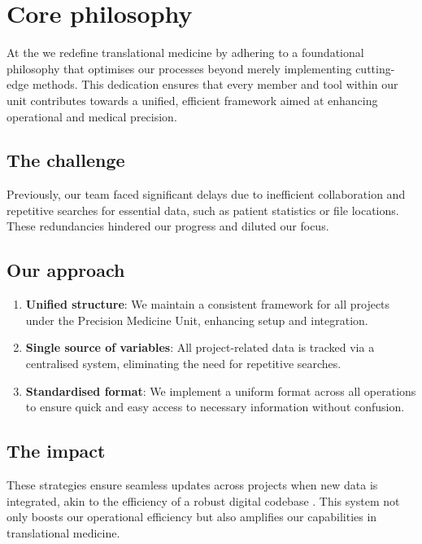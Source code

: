 \section{Core philosophy}

At the \pmu we redefine translational medicine by adhering to a foundational philosophy that optimises our processes beyond merely implementing cutting-edge methods. This dedication ensures that every member and tool within our unit contributes towards a unified, efficient framework aimed at enhancing operational and medical precision.

\subsection*{The challenge}

Previously, our team faced significant delays due to inefficient collaboration and repetitive searches for essential data, such as patient statistics or file locations. These redundancies hindered our progress and diluted our focus.

\subsection*{Our approach}

\begin{enumerate}
\item \textbf{Unified structure}: We maintain a consistent framework for all projects under the Precision Medicine Unit, enhancing setup and integration.
\item \textbf{Single source of variables}: All project-related data is tracked via a centralised system, eliminating the need for repetitive searches.
\item \textbf{Standardised format}: We implement a uniform format across all operations to ensure quick and easy access to necessary information without confusion.
\end{enumerate}

\subsection*{The impact}

These strategies ensure seamless updates across projects when new data is integrated, akin to the efficiency of a robust digital codebase \citep{potvin_levenberg_google_ACM}. This system not only boosts our operational efficiency but also amplifies our capabilities in translational medicine.

